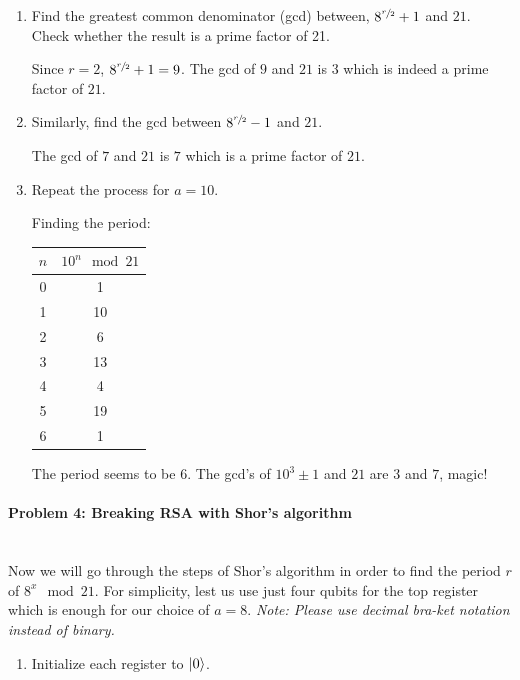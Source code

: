 \documentclass[12pt]{article}
\newenvironment{answer}{\begingroup\setlength{\leftskip}{-\leftmargin}\begin{framed}}{\end{framed}\endgroup}
\begin{document}
\begin{enumerate}
    \item Find the greatest common denominator (gcd) between, $8^{\sfrac{r}{2}} + 1$ and $21$. Check whether the result is a prime factor of 21.

    \begin{answer}
        Since $r = 2$, $8^{\sfrac{r}{2}} + 1 = 9$. The gcd of $9$ and $21$ is $3$ which is indeed a prime factor of $21$.
    \end{answer}

    \item Similarly, find the gcd between $8^{\sfrac{r}{2}} - 1$ and $21$.

    \begin{answer}
        The gcd of $7$ and $21$ is $7$ which is a prime factor of $21$.
    \end{answer}

    \item Repeat the process for $a = 10$.

    \begin{answer}
        Finding the period:
        \begin{tabular}{c|c}
            $n$ & $10^n \mod 21$ \\
            \hline
            0 & 1 \\
            1 & 10 \\
            2 & 6 \\
            3 & 13 \\
            4 & 4 \\
            5 & 19 \\
            6 & 1 \\
        \end{tabular}
        The period seems to be $6$.
        The gcd's of $10^3 \pm 1$ and $21$ are $3$ and $7$, magic!
    \end{answer}
\end{enumerate}

\paragraph{Problem 4: Breaking RSA with Shor's algorithm} \hfill \\

Now we will go through the steps of Shor's algorithm in order to find the period $r$ of $8^x\mod21$. For simplicity, lest us use just four qubits for the top register which is enough for our choice of $a = 8$.
\emph{Note: Please use decimal bra-ket notation instead of binary. }

\begin{enumerate}
    \item Initialize each register to $\ket{0}$.
\end{enumerate}
\end{document}
